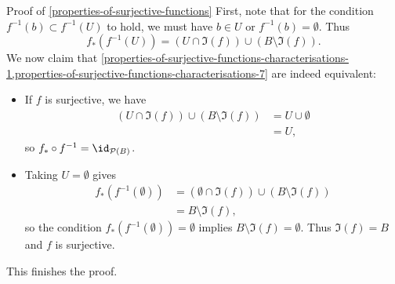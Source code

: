 \begin{Proof}{Proof of \cref{properties-of-surjective-functions}}
    First, note that for the condition $f^{-1}(b)\subset f^{-1}(U)$ to hold, we must have $b\in U$ or $f^{-1}(b)=\emptyset$. Thus
    \[
        f_{*}(f^{-1}(U))%
        =%
        (U\cap\Im(f))%
        \cup%
        (B\setminus\Im(f)).%
    \]%
    We now claim that \cref{properties-of-surjective-functions-characterisations-1,properties-of-surjective-functions-characterisations-7} are indeed equivalent:
    \begin{itemize}
        \item{}If $f$ is surjective, we have
            \begin{align*}
                (U\cap\Im(f))\cup(B\setminus\Im(f)) &= U\cup\emptyset\\
                                                    &= U,
            \end{align*}
            so $f_{*}\circ f^{-1}=\id_{\mathcal{P}(B)}$.
        \item{}Taking $U=\emptyset$ gives
            \begin{align*}
                f_{*}(f^{-1}(\emptyset)) &= (\emptyset\cap\Im(f))\cup(B\setminus\Im(f))\\%
                                         &= B\setminus\Im(f),%
            \end{align*}
            so the condition $f_{*}(f^{-1}(\emptyset))=\emptyset$ implies $B\setminus\Im(f)=\emptyset$. Thus $\Im(f)=B$ and $f$ is surjective.
    \end{itemize}
    This finishes the proof.
\end{Proof}
\begin{appendices}

\end{appendices}

